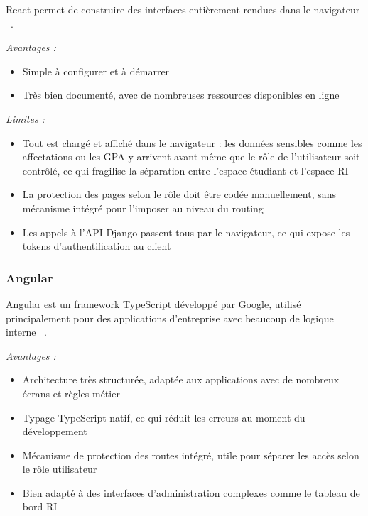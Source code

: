React  permet de construire des interfaces
entièrement rendues dans le navigateur ~\cite{react_dev}.

\textit{Avantages :}
\begin{itemize}
  \item Simple à configurer et à démarrer
  \item Très bien documenté, avec de nombreuses
        ressources disponibles en ligne
\end{itemize}

\textit{Limites :}
\begin{itemize}
  \item Tout est chargé et affiché dans le navigateur :
        les données sensibles comme les affectations
        ou les GPA y arrivent avant même que
        le rôle de l'utilisateur soit contrôlé,
        ce qui fragilise la séparation entre
        l'espace étudiant et l'espace RI
  \item La protection des pages selon le rôle
        doit être codée manuellement, sans
        mécanisme intégré pour l'imposer
        au niveau du routing
  \item Les appels à l'API Django passent tous
        par le navigateur, ce qui expose
        les tokens d'authentification au client
\end{itemize}

\subsubsection{Angular}

Angular est un framework TypeScript développé
par Google, utilisé principalement pour des
applications d'entreprise avec beaucoup de
logique interne ~\cite{angular_dev}.

\textit{Avantages :}
\begin{itemize}
  \item Architecture très structurée, adaptée aux
        applications avec de nombreux écrans
        et règles métier
  \item Typage TypeScript natif, ce qui réduit
        les erreurs au moment du développement
  \item Mécanisme de protection des routes intégré,
        utile pour séparer les accès
        selon le rôle utilisateur
  \item Bien adapté à des interfaces
        d'administration complexes
        comme le tableau de bord RI
\end{itemize}

